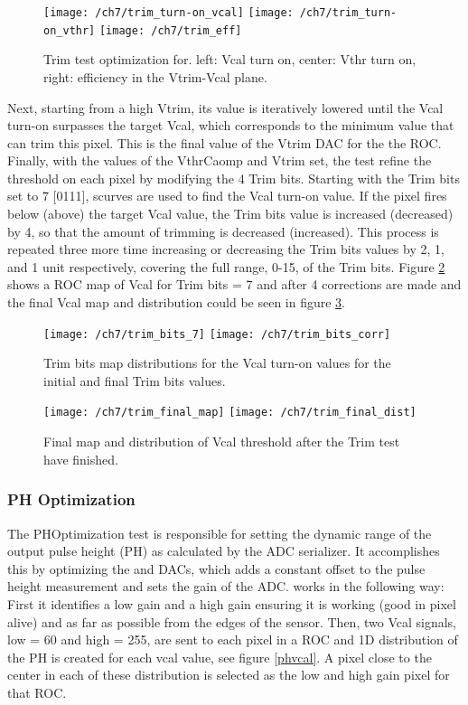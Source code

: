 \begin{figure}[!h]
  \centering
  \texttt{[image: /ch7/trim\_turn-on\_vcal]}
  \texttt{[image: /ch7/trim\_turn-on\_vthr]}
  \texttt{[image: /ch7/trim\_eff]}
  \caption[Trim test turn on]{Trim test optimization for. left: Vcal turn on, center: Vthr turn on, right: efficiency in the Vtrim-Vcal plane.}\label{fig:turn-on}
\end{figure}

Next, starting from a high Vtrim, its value is iteratively lowered until the Vcal turn-on surpasses the target Vcal, which corresponds to the minimum value that can trim this pixel. This is the final value of the Vtrim DAC for the the ROC. Finally, with the values of the VthrCaomp and Vtrim set, the test refine the threshold on each pixel by modifying the 4 Trim bits. Starting with the Trim bits set to 7 [0111],    scurves are used to find the Vcal turn-on value. If the pixel {} fires below (above) the target Vcal value, the Trim bits value is increased (decreased) by 4, so that the amount of trimming is decreased (increased). This process is repeated three more time increasing or decreasing the Trim bits values by 2, 1, and 1 unit respectively, covering the full range, 0-15, of the Trim bits. Figure \ref{fig:trim_bits} shows a ROC map of Vcal for Trim bits = 7 and after 4 corrections are made and the final Vcal map and distribution could be seen in figure \ref{fig:trim_final}. 

\begin{figure}[!h]
  \centering
  \texttt{[image: /ch7/trim\_bits\_7]}
  \texttt{[image: /ch7/trim\_bits\_corr]}
  \caption[Trim test Trim bits]{Trim bits map distributions for the Vcal turn-on values for the initial  and final Trim bits values.}\label{fig:trim_bits}
\end{figure}

\begin{figure}[!h]
  \centering
  \texttt{[image: /ch7/trim\_final\_map]}
  \texttt{[image: /ch7/trim\_final\_dist]}
  \caption[Trim test final]{Final map and distribution of Vcal threshold after the Trim test have finished.}\label{fig:trim_final}
\end{figure}

\subsubsection{PH Optimization}
The PHOptimization test is responsible for setting the dynamic range of the output pulse height (PH) as calculated by the ADC serializer. It accomplishes this by optimizing the  and  DACs, which adds a constant offset to the pulse height measurement and sets the gain of the ADC.  works in the following way: First it identifies a low gain and a high gain ensuring it is working (good in pixel alive) and as far as possible from the edges of the sensor. Then, two Vcal signals, low = 60 and high = 255, are sent to each pixel in a ROC and 1D distribution of the PH is created for each vcal value, see figure \ref{phvcal}. A pixel close to the center in each of these distribution is selected as the low and high gain pixel for that ROC.


